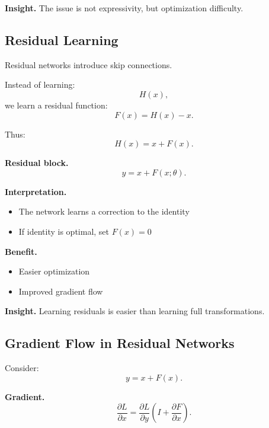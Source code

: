\medskip

\noindent
\textbf{Insight.}  
The issue is not expressivity, but optimization difficulty.

\subsection{Residual Learning}

Residual networks introduce skip connections.

\medskip

\noindent
Instead of learning:
\[
H(x),
\]
we learn a residual function:
\[
F(x) = H(x) - x.
\]

\medskip

\noindent
Thus:
\[
H(x) = x + F(x).
\]

\medskip

\noindent
\textbf{Residual block.}
\[
y = x + F(x; \theta).
\]

\medskip

\noindent
\textbf{Interpretation.}

\begin{itemize}
    \item The network learns a correction to the identity
    \item If identity is optimal, set $F(x) = 0$
\end{itemize}

\medskip

\noindent
\textbf{Benefit.}
\begin{itemize}
    \item Easier optimization
    \item Improved gradient flow
\end{itemize}

\medskip

\noindent
\textbf{Insight.}  
Learning residuals is easier than learning full transformations.

\subsection{Gradient Flow in Residual Networks}

Consider:
\[
y = x + F(x).
\]

\medskip

\noindent
\textbf{Gradient.}
\[
\frac{\partial L}{\partial x}
= \frac{\partial L}{\partial y}
\left( I + \frac{\partial F}{\partial x} \right).
\]

\medskip

